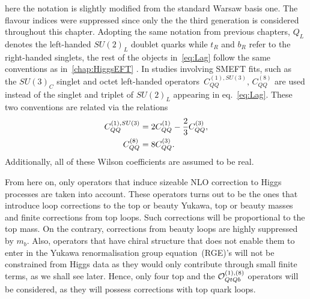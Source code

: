 %
here the notation is slightly modified from the standard Warsaw basis one. The flavour indices were suppressed since only the the third generation is considered throughout this chapter. Adopting the same notation from previous chapters, $Q_L$ denotes the left-handed $SU(2)_L$ doublet quarks while  $t_R$ and $b_R$ refer to the right-handed singlets, the rest of the objects in~\eqref{eq:Lag} follow the same conventions as in~\autoref{chap:HiggsEFT} .  In studies involving SMEFT fits, such as ~\cite{Ethier:2021bye} the $SU(3)_C$ singlet and octet left-handed operators~$C_{QQ}^{(1),SU(3)},\,C_{QQ}^{(8)}$ are used instead of the singlet and triplet of $SU(2)_L$ appearing in eq.~\eqref{eq:Lag}. These two conventions are related via the relations
\begin{align}
C_{QQ}^{(1),SU(3)} &= 2 C_{QQ}^{(1)} -\frac{2}{3} C_{QQ}^{(3)}, \nonumber \\
C_{QQ}^{(8)} &= 8 C_{QQ}^{(3)}.
\end{align}
Additionally, all of these Wilson coefficients are assumed to be real.\\
\par  From here on, only operators that induce sizeable NLO correction to Higgs processes are taken into account. These operators turns out to be the ones that introduce loop corrections to the top or beauty Yukawa, top or beauty masses and finite corrections from top loops. Such corrections will be proportional to the top mass. On the contrary, corrections from beauty loops are highly suppressed by $m_b$. Also, operators that have chiral structure that does not enable them to enter in the Yukawa renormalisation group equation~(RGE)'s will not be constrained from Higgs data as they would only contribute through small finite terms, as we shall see later.  Hence, only four top and the  ${\cal O}_{QtQb}^{(1),(8)}$ operators will be considered, as they will possess corrections with top quark loops.
